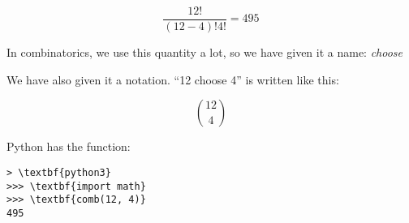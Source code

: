 $$\frac{12!}{(12-4)! 4!}= 495$$

In combinatorics, we use this quantity a lot, so we have given it a name: \textit{choose}

We have also given it a notation.  ``12 choose 4'' is written like this:

$${12 \choose 4}$$

Python has the  function:

\begin{Verbatim}[commandchars=\\\{\}]
> \textbf{python3}
>>> \textbf{import math}
>>> \textbf{comb(12, 4)}
495  
\end{Verbatim}

